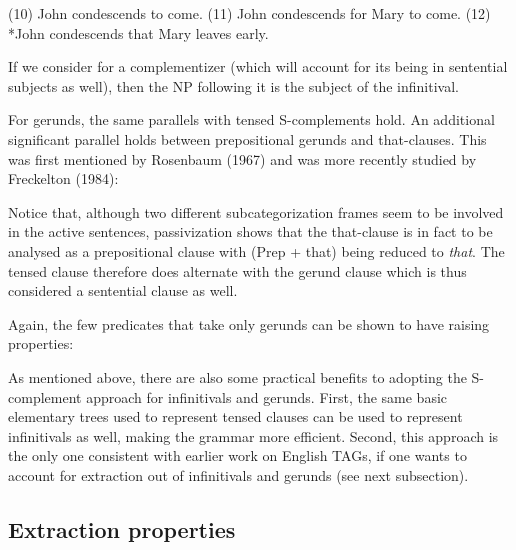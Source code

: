 (10)	John condescends to come.
(11)	John condescends for Mary to come.
(12)	*John condescends that Mary leaves early.

If we consider for  a
complementizer (which will account for its being in sentential subjects as well),
 then the NP following it is the subject of the
 infinitival.


For gerunds, the same parallels with tensed S-complements hold. An additional significant parallel holds  
between prepositional gerunds and that-clauses.  This was first mentioned by Rosenbaum (1967)\nocite{ros67}
and was more recently studied by Freckelton (1984)\nocite{freck84b}:

\beginsentences
{}
\endsentences

Notice that, although two different subcategorization frames seem to be involved in the
active sentences, passivization shows that the that-clause is in fact to be analysed
 as a
prepositional clause with (Prep + that) being reduced to {\it that}. 
 The tensed clause therefore
does alternate with the gerund clause  which is thus considered a
sentential clause as well.

Again, the few predicates that take only gerunds can be shown to have raising properties:

\beginsentences
{}
\endsentences

As mentioned above, there are also some practical benefits to adopting the
 S-complement approach for infinitivals and gerunds.
First, the same basic elementary trees used to represent tensed clauses can be used to represent infinitivals 
as well, making the grammar more efficient.  Second, this approach is the only one consistent
 with earlier work on English
TAGs, if one wants to account for extraction out of infinitivals and 
gerunds (see next subsection).       

\subsection{Extraction properties}

